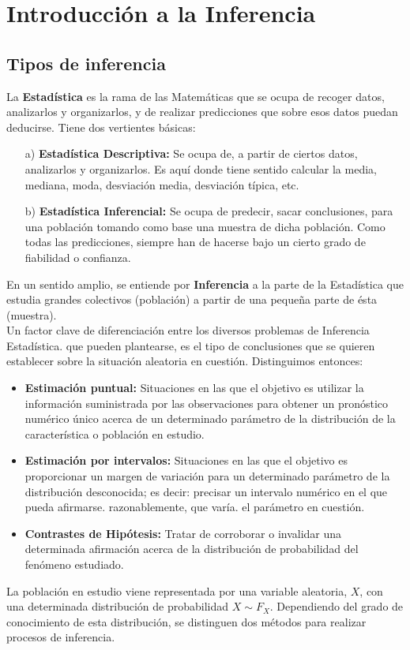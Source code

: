 \chapter{Introducción a la Inferencia}

\section{Tipos de inferencia}

La \textbf{Estadística} es la rama de las Matemáticas que se ocupa de recoger datos, analizarlos y organizarlos, y de realizar predicciones que sobre esos datos puedan deducirse. Tiene dos vertientes básicas:
\begin{enumerate}
    \item[a)] \textbf{Estadística Descriptiva:} Se ocupa de, a partir de ciertos datos, analizarlos y organizarlos. Es aquí donde tiene sentido calcular la media, mediana, moda, desviación media, desviación típica, etc.
    \item[b)] \textbf{Estadística Inferencial:} Se ocupa de predecir, sacar conclusiones, para una población tomando como base una muestra de dicha población. Como todas las predicciones, siempre han de hacerse bajo un cierto grado de fiabilidad o confianza. 
\end{enumerate}
En un sentido amplio, se entiende por \textbf{Inferencia} a la parte de la Estadística que estudia grandes colectivos (población) a partir de una pequeña parte de ésta (muestra).
\\
\newline
Un factor clave de diferenciación entre los diversos problemas de Inferencia Estadística. que pueden plantearse, es el tipo de conclusiones que se quieren establecer sobre la situación aleatoria en cuestión. Distinguimos entonces:

\begin{itemize}
    \item \textbf{Estimación puntual:} Situaciones en las que el objetivo es utilizar la información suministrada por las observaciones para obtener un pronóstico numérico único acerca de un determinado parámetro de la distribución de la característica o población en estudio.
    \item \textbf{Estimación por intervalos:} Situaciones en las que el objetivo es proporcionar un margen de variación para un determinado parámetro de la distribución desconocida; es decir: precisar un intervalo numérico en el que pueda afirmarse. razonablemente, que varía. el parámetro en cuestión.
    \item \textbf{Contrastes de Hipótesis:} Tratar de corroborar o invalidar una determinada afirmación acerca de la distribución de probabilidad del fenómeno estudiado.
\end{itemize}
La población en estudio viene representada por una variable aleatoria, $X$, con una determinada distribución de probabilidad $X \sim F_X$. Dependiendo del grado de conocimiento de esta distribución, se distinguen dos métodos para realizar procesos de inferencia.


